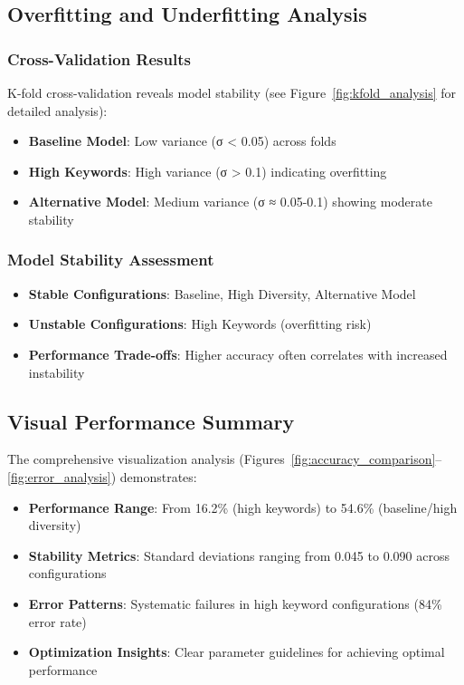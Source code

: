 \documentclass[12pt,a4paper]{article}
\begin{document}
\subsection{Overfitting and Underfitting Analysis}

\subsubsection{Cross-Validation Results}
K-fold cross-validation reveals model stability (see Figure~\ref{fig:kfold_analysis} for detailed analysis):

\begin{itemize}
    \item \textbf{Baseline Model}: Low variance (σ < 0.05) across folds
    \item \textbf{High Keywords}: High variance (σ > 0.1) indicating overfitting
    \item \textbf{Alternative Model}: Medium variance (σ ≈ 0.05-0.1) showing moderate stability
\end{itemize}

\subsubsection{Model Stability Assessment}
\begin{itemize}
    \item \textbf{Stable Configurations}: Baseline, High Diversity, Alternative Model
    \item \textbf{Unstable Configurations}: High Keywords (overfitting risk)
    \item \textbf{Performance Trade-offs}: Higher accuracy often correlates with increased instability
\end{itemize}

\subsection{Visual Performance Summary}
The comprehensive visualization analysis (Figures~\ref{fig:accuracy_comparison}--\ref{fig:error_analysis}) demonstrates:
\begin{itemize}
    \item \textbf{Performance Range}: From 16.2\% (high keywords) to 54.6\% (baseline/high diversity)
    \item \textbf{Stability Metrics}: Standard deviations ranging from 0.045 to 0.090 across configurations
    \item \textbf{Error Patterns}: Systematic failures in high keyword configurations (84\% error rate)
    \item \textbf{Optimization Insights}: Clear parameter guidelines for achieving optimal performance
\end{itemize}
\end{document}
